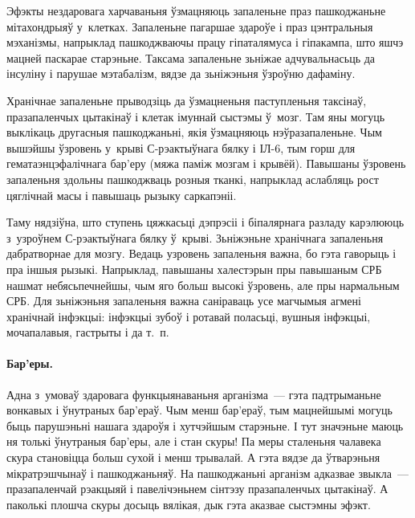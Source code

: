 
Эфэкты нездаровага харчаваньня ўзмацняюць запаленьне праз пашкоджаньне мітахондрыяў у~клетках. Запаленьне пагаршае здароўе і праз цэнтральныя мэханізмы, напрыклад пашкоджваючы працу гіпаталямуса і гіпакампа, што яшчэ мацней паскарае старэньне. Таксама запаленьне зьніжае адчувальнасьць да інсуліну і парушае мэтабалізм, вядзе да зьніжэньня ўзроўню дафаміну.

Хранічнае запаленьне прыводзіць да ўзмацненьня паступленьня таксінаў, празапаленчых цытакінаў і клетак імуннай сыстэмы ў~мозг. Там яны могуць выклікаць другасныя пашкоджаньні, якія ўзмацняюць нэўразапаленьне. Чым вышэйшы ўзровень у~крыві С-рэактыўнага бялку і ІЛ-6, тым горш для гематаэнцэфалічнага бар'еру (мяжа паміж мозгам і крывёй). Павышаны ўзровень запаленьня здольны пашкоджваць розныя тканкі, напрыклад аслабляць рост цяглічнай масы і павышаць рызыку саркапэніі.

Таму нядзіўна, што ступень цяжкасьці дэпрэсіі і біпалярнага разладу карэлююць з~узроўнем С-рэактыўнага бялку ў~крыві. Зьніжэньне хранічнага запаленьня дабратворнае для мозгу. Ведаць узровень запаленьня важна, бо гэта гаворыць і пра іншыя рызыкі. Напрыклад, павышаны халестэрын пры павышаным СРБ нашмат небясьпечнейшы, чым яго больш высокі ўзровень, але пры нармальным СРБ. Для зьніжэньня запаленьня важна саніраваць усе магчымыя агмені хранічнай інфэкцыі: інфэкцыі зубоў і ротавай поласьці, вушныя інфэкцыі, мочапалавыя, гастрыты і да т.~п.

\paragraph{Бар'еры.} Адна з~умоваў здаровага функцыянаваньня арганізма~--- гэта падтрыманьне вонкавых і ўнутраных бар'ераў. Чым менш бар'ераў, тым мацнейшымі могуць быць парушэньні нашага здароўя і хутчэйшым старэньне. І тут значэньне маюць ня толькі ўнутраныя бар'еры, але і стан скуры! Па меры сталеньня чалавека скура становіцца больш сухой і менш трывалай. А гэта вядзе да ўтварэньня мікратрэшчынаў і пашкоджаньняў. На пашкоджаньні арганізм адказвае звыкла~--- празапаленчай рэакцыяй і павелічэньнем сінтэзу празапаленчых цытакінаў. А паколькі плошча скуры досыць вялікая, дык гэта аказвае сыстэмны эфэкт.

